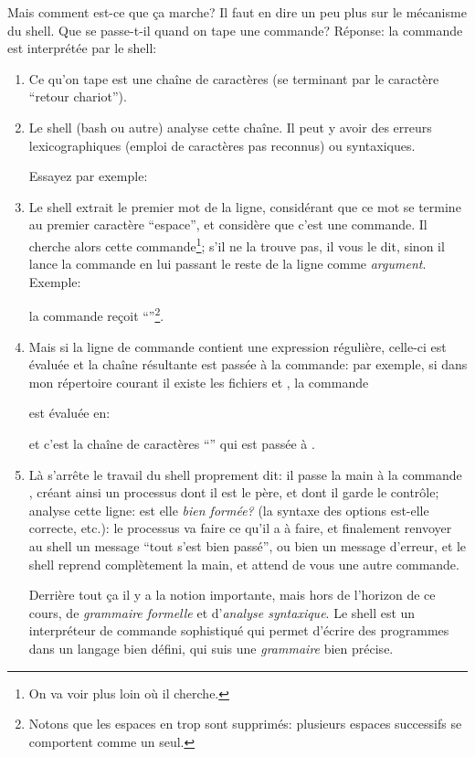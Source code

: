   Mais comment est-ce que ça marche? Il faut en dire un peu plus sur
  le mécanisme du shell. Que se passe-t-il quand on tape une commande?
  Réponse: la commande est interprétée par le shell:

  \begin{enumerate}
    \item Ce qu'on tape est une chaîne de caractères (se terminant par
      le caractère ``retour chariot'').
    \item Le shell (bash ou autre) analyse cette chaîne. Il peut y
      avoir des erreurs lexicographiques (emploi de caractères pas
      reconnus) ou syntaxiques.

      Essayez par exemple:

    \item Le shell extrait le premier mot de la ligne, considérant que
      ce mot se termine au premier caractère ``espace'', et considère
      que c'est une commande. Il cherche alors cette
      commande\footnote{On va voir plus loin où il cherche.}; s'il ne
      la trouve pas, il vous le dit, sinon il lance la commande en
      lui passant le reste de la ligne comme \emph{argument}. Exemple:
      

      la 
      commande  reçoit ``''\footnote{Notons que les
        espaces en trop sont supprimés: plusieurs espaces successifs se
        comportent comme un  seul.}.
    \item Mais si la ligne de commande contient une expression régulière,
      celle-ci est évaluée et la chaîne résultante est  passée à la
      commande: par  exemple,  si dans mon répertoire 
      courant il existe les 
      fichiers  et , la commande


      est évaluée en:


      et
      c'est la chaîne de caractères ``'' qui
      est passée à .
    \item Là s'arrête le travail du shell proprement dit: il passe la
      main à la commande  , créant ainsi un
        processus dont il est le père, et dont il garde le contrôle; 
      analyse cette ligne: 
      est elle \emph{bien formée?} (la syntaxe des options est-elle
      correcte, etc.): le processus  va faire ce qu'il a à faire, et
      finalement renvoyer au shell un message ``tout s'est bien passé'',
      ou bien un message d'erreur, et le shell reprend
      complètement la main, et attend de vous une autre commande.


      Derrière tout ça il y a la notion importante,
      mais hors de l'horizon de ce cours, de \emph{grammaire formelle}
      et d'\emph{analyse syntaxique}. Le shell est un interpréteur de
      commande sophistiqué qui permet d'écrire des programmes dans un
      langage bien défini, qui suis une \emph{grammaire} bien précise.
   \end{enumerate} 
